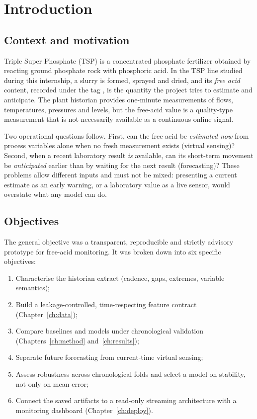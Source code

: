 \chapter{Introduction}\label{ch:intro}

\section{Context and motivation}
Triple Super Phosphate (TSP) is a concentrated phosphate fertilizer obtained by reacting ground phosphate rock with phosphoric acid. In the TSP line studied during this internship, a slurry is formed, sprayed and dried, and its \emph{free acid} content, recorded under the tag , is the quantity the project tries to estimate and anticipate. The plant historian provides one-minute measurements of flows, temperatures, pressures and levels, but the free-acid value is a quality-type measurement that is not necessarily available as a continuous online signal.

Two operational questions follow. First, can the free acid be \emph{estimated now} from process variables alone when no fresh measurement exists (virtual sensing)? Second, when a recent laboratory result \emph{is} available, can its short-term movement be \emph{anticipated} earlier than by waiting for the next result (forecasting)? These problems allow different inputs and must not be mixed: presenting a current estimate as an early warning, or a laboratory value as a live sensor, would overstate what any model can do.

\section{Objectives}
The general objective was a transparent, reproducible and strictly advisory prototype for free-acid monitoring. It was broken down into six specific objectives:
\begin{enumerate}
\item Characterise the historian extract (cadence, gaps, extremes, variable semantics);
\item Build a leakage-controlled, time-respecting feature contract (Chapter~\ref{ch:data});
\item Compare baselines and models under chronological validation (Chapters~\ref{ch:method} and~\ref{ch:results});
\item Separate future forecasting from current-time virtual sensing;
\item Assess robustness across chronological folds and select a model on stability, not only on mean error;
\item Connect the saved artifacts to a read-only streaming architecture with a monitoring dashboard (Chapter~\ref{ch:deploy}).
\end{enumerate}

